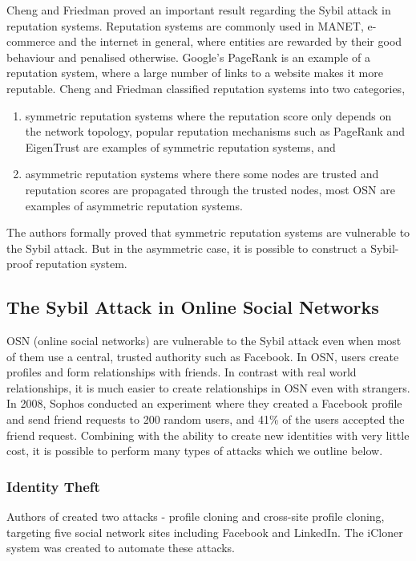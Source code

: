 Cheng and Friedman proved an important result regarding the Sybil attack in
reputation systems\cite{cheng2005sybilproof}. Reputation systems are commonly
used in MANET, e-commerce and the internet in general, where entities are
rewarded by their good behaviour and penalised otherwise. Google's
PageRank\cite{page1999pagerank} is an example of a reputation system, where a
large number of links to a website makes it more reputable. Cheng and Friedman
classified reputation systems into two categories,
\begin{enumerate}
\item symmetric reputation systems where the reputation score only depends on
  the network topology, popular reputation mechanisms such as
  PageRank\cite{page1999pagerank} and EigenTrust\cite{kamvar2003eigentrust} are
  examples of symmetric reputation systems, and
    \item asymmetric reputation systems where there some nodes are trusted and
      reputation scores are propagated through the trusted nodes, most OSN are
      examples of asymmetric reputation systems.
\end{enumerate}
The authors formally proved that symmetric reputation systems are vulnerable to
the Sybil attack. But in the asymmetric case, it is possible to construct a
Sybil-proof reputation system.

\subsection{The Sybil Attack in Online Social Networks}
OSN (online social networks) are vulnerable to the Sybil attack even when most
of them use a central, trusted authority such as Facebook. In OSN, users create
profiles and form relationships with friends. In contrast with real world
relationships, it is much easier to create relationships in OSN even with
strangers. In 2008, Sophos conducted an experiment where they created a Facebook
profile and send friend requests to 200 random users, and 41\% of the users
accepted the friend request\cite{sophos}. Combining with the ability to create
new identities with very little cost, it is possible to perform many types of
attacks which we outline below.

\subsubsection{Identity Theft}
Authors of \cite{bilge2009all} created two attacks - profile cloning and
cross-site profile cloning, targeting five social network sites including
Facebook and LinkedIn. The iCloner system was created to automate these
attacks.

